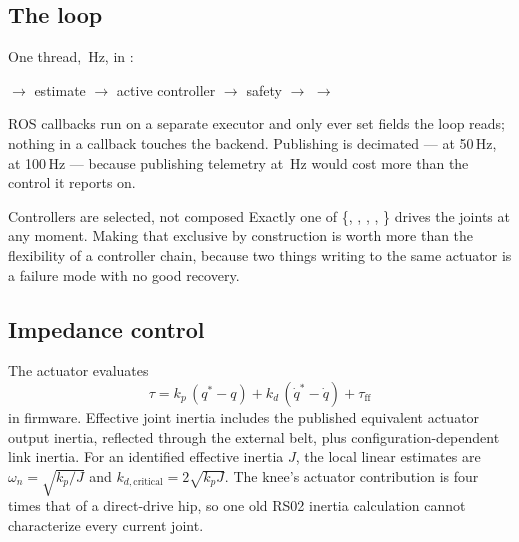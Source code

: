 \documentclass[11pt,a4paper]{article}
\begin{document}

\subsection{The loop}

One thread, \RdControlRate\,Hz, in :

\begin{center}\small
{} $\to$ estimate $\to$ active controller $\to$ safety $\to$  $\to$ 
\end{center}

ROS callbacks run on a separate executor and only ever set fields the loop
reads; nothing in a callback touches the backend. Publishing is decimated ---
 at 50\,Hz,  at 100\,Hz --- because
publishing telemetry at \RdControlRate\,Hz would cost more than the control it
reports on.


\begin{decision}{Controllers are selected, not composed}
Exactly one of \{, , , ,
\} drives the joints at any moment. Making that exclusive by
construction is worth more than the flexibility of a controller chain, because
two things writing to the same actuator is a failure mode with no good recovery.
\end{decision}

\subsection{Impedance control}

The actuator evaluates
\[
\tau = k_p\,(q^{*} - q) + k_d\,(\dot q^{*} - \dot q) + \tau_{\mathrm{ff}}
\]
in firmware. Effective joint inertia includes the published equivalent actuator
output inertia, reflected through the external belt, plus configuration-dependent
link inertia. For an identified effective inertia $J$, the local linear estimates
are $\omega_n=\sqrt{k_p/J}$ and $k_{d,\mathrm{critical}}=2\sqrt{k_pJ}$.
The knee's actuator contribution is four times that of a direct-drive hip, so
one old RS02 inertia calculation cannot characterize every current joint.
\end{document}
